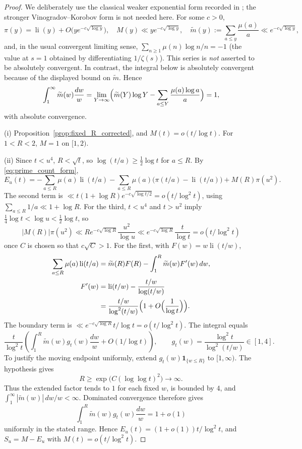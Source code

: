 \documentclass[11pt]{amsart}
\numberwithin{equation}{section}
\theoremstyle{plain}
\theoremstyle{definition}
\theoremstyle{remark}
\DeclareMathOperator{\li}{li}
\newcommand{\mt}{\widetilde{m}}
\begin{document}
\begin{proof}
We deliberately use the classical weaker exponential form recorded in
\cite{MontgomeryVaughan2007}; the stronger Vinogradov--Korobov form is not
needed here.  For some $c>0$,
\begin{equation}
\label{eq:pnt_inputs}
  \pi(y)=\li(y)+O\bigl(ye^{-c\sqrt{\log y}}\bigr),\quad
  M(y)\ll ye^{-c\sqrt{\log y}},\quad
  \mt(y):=\sum_{a\le y}\frac{\mu(a)}a\ll e^{-c\sqrt{\log y}},
\end{equation}
and, in the usual convergent limiting sense,
$\sum_{n\ge1}\mu(n)\log n/n=-1$ (the value at $s=1$ obtained by
differentiating $1/\zeta(s)$).  This series is \emph{not} asserted to be
absolutely convergent.  In contrast, the integral below is absolutely
convergent because of the displayed bound on $\mt$. Hence
\begin{equation}
\label{eq:mtilde_integral}
  \int_1^\infty\mt(w)\frac{dw}w
  =\lim_{Y\to\infty}\Bigl(\mt(Y)\log Y-\sum_{a\le Y}\frac{\mu(a)\log a}a\Bigr)=1,
\end{equation}
with absolute convergence.

(i) Proposition~\ref{prop:fixed_R_corrected}, and $M(t)=o(t/\log t)$. For
$1<R<2$, $M=1$ on $[1,2)$.

(ii) Since $t<u^4$, $R<\sqrt t$, so $\log(t/a)\ge\frac12\log t$ for
$a\le R$. By \eqref{eq:prime_count_form},
\begin{equation}
\label{eq:E_three_terms}
  E_u(t)=-\sum_{a\le R}\mu(a)\li(t/a)
  -\sum_{a\le R}\mu(a)\bigl(\pi(t/a)-\li(t/a)\bigr)+M(R)\pi(u^2).
\end{equation}
The second term is
$\ll t(1+\log R)e^{-c\sqrt{\log t/2}}=o(t/\log^2t)$, using
$\sum_{a\le R}1/a\ll1+\log R$.  For the third, $t<u^4$ and $t>u^2$ imply
$\tfrac14\log t<\log u<\tfrac12\log t$, so
\[
|M(R)|\pi(u^2)\ll Re^{-c\sqrt{\log R}}\frac{u^2}{\log u}
\ll e^{-c\sqrt{\log R}}\frac{t}{\log t}
=o(t/\log^2t)
\]
once $C$ is chosen so that $c\sqrt C>1$. For the first, with
$F(w)=w\li(t/w)$,
\begin{align}
\label{eq:partial_summation_li}
  \sum_{a\le R}\mu(a)\li(t/a)
  &=\mt(R)F(R)-\int_1^R\mt(w)F'(w)\,dw,\\
  F'(w)
  &=\li(t/w)-\frac{t/w}{\log(t/w)}\notag\\
  &=\frac{t/w}{\log^2(t/w)}
    \Bigl(1+O\Bigl(\frac1{\log t}\Bigr)\Bigr).\notag
\end{align}
The boundary term is $\ll e^{-c\sqrt{\log R}}t/\log t=o(t/\log^2t)$. The integral equals
\[
\frac t{\log^2t}\left(\int_1^R\mt(w)g_t(w)\frac{dw}w+O(1/\log t)\right),
\qquad
g_t(w)=\frac{\log^2t}{\log^2(t/w)}\in[1,4].
\]
To justify the moving endpoint uniformly, extend
$g_t(w)\mathbf1_{\{w\le R\}}$ to $[1,\infty)$.  The hypothesis gives
\[
R\ge\exp\!\bigl(C(\log\log t)^2\bigr)\longrightarrow\infty.
\]
Thus the extended factor tends to $1$ for each fixed $w$, is bounded by $4$,
and $\int_1^\infty|\mt(w)|\,dw/w<\infty$.  Dominated convergence therefore gives
\[
\int_1^R\mt(w)g_t(w)\frac{dw}w=1+o(1)
\]
uniformly in the stated range.  Hence
$E_u(t)=(1+o(1))t/\log^2t$, and $S_u=M-E_u$ with $M(t)=o(t/\log^2t)$.
\end{proof}
\end{document}

